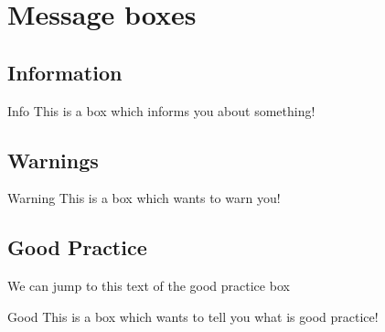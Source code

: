%
%
%
\chapter{Message boxes}



\section{Information}


\begin{boxinfo}{Info}{
 This is a box which informs you about something!}
\end{boxinfo}


\section{Warnings}

\begin{boxwarning}{Warning}{
 This is a box which wants to warn you!}
\end{boxwarning}


\section{Good Practice}\label{box:good_practice}

\hypertarget{htbox:good_practice}{We can jump to this text of the good practice box}
\begin{boxgoodpractice}{Good}{
 This is a box which wants to tell you what is good practice!}
\end{boxgoodpractice}